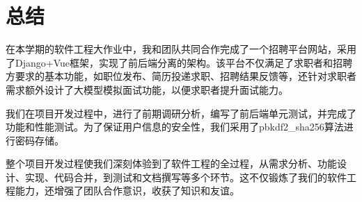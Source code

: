 \documentclass[UTF8,a4paper,10pt]{ctexart}
\begin{document}
\section{总结}

在本学期的软件工程大作业中，我和团队共同合作完成了一个招聘平台网站，采用了Django+Vue框架，实现了前后端分离的架构。该平台不仅满足了求职者和招聘方要求的基本功能，如职位发布、简历投递求职、招聘结果反馈等，还针对求职者需求额外设计了大模型模拟面试功能，以便求职者提升面试能力。

我们在项目开发过程中，进行了前期调研分析，编写了前后端单元测试，并完成了功能和性能测试。为了保证用户信息的安全性，我们采用了pbkdf2\_sha256算法进行密码存储。

整个项目开发过程使我们深刻体验到了软件工程的全过程，从需求分析、功能设计、实现、代码合并，到测试和文档撰写等多个环节。这不仅锻炼了我们的软件工程能力，还增强了团队合作意识，收获了知识和友谊。

\end{document}
